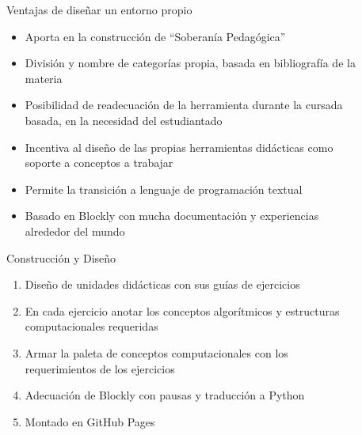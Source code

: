 \documentclass[final]{beamer}
\newlength{\sepwid}
\newlength{\twocolwid}
\begin{document}
\begin{frame}[t]
\begin{columns}[t]
\begin{column}{\twocolwid}




\end{column} %

\begin{column}{\sepwid}\end{column} %

\begin{column}{\sepwid}\end{column} %

\begin{column}{\twocolwid} %


\begin{block}{Ventajas de diseñar un entorno propio}
\begin{itemize}
    \item Aporta en la construcción de ``Soberanía Pedagógica''
    \item División y nombre de categorías propia, basada en bibliografía de la materia
    \item Posibilidad de readecuación de la herramienta durante la cursada basada, en la necesidad del estudiantado
    \item Incentiva al diseño de las propias herramientas didácticas como soporte a conceptos a trabajar
    \item Permite la transición a lenguaje de programación textual
    \item Basado en Blockly\cite{blockly} con mucha documentación y experiencias alrededor del mundo
\end{itemize}


\end{block}

\begin{block}{Construcción y Diseño}
    \begin{enumerate}
        \item Diseño de unidades didácticas con sus guías de ejercicios
        \item En cada ejercicio anotar los conceptos algorítmicos y estructuras computacionales requeridas
        \item Armar la paleta de conceptos computacionales con los requerimientos de los ejercicios
        \item Adecuación de Blockly\cite{blockly} con pausas y traducción a Python 
        \item Montado en GitHub Pages


\end{enumerate}
\end{block}
\end{column}
\end{columns}
\end{frame}
\end{document}
